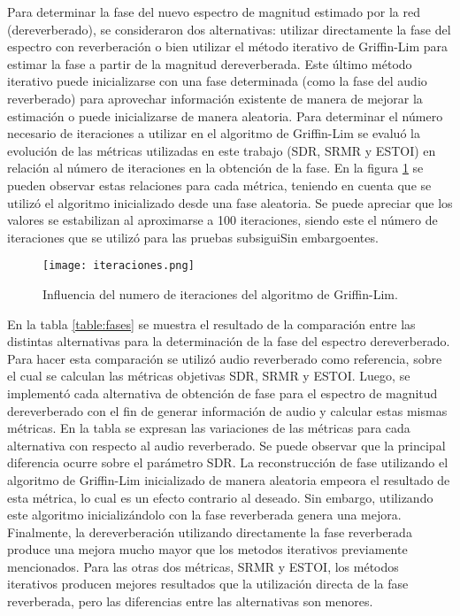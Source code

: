 Para determinar la fase del nuevo espectro de magnitud estimado por la red (dereverberado), se consideraron dos alternativas: utilizar directamente la fase del espectro con reverberación o bien utilizar el método iterativo de Griffin-Lim para estimar la fase a partir de la magnitud dereverberada. Este último método iterativo puede inicializarse con una fase determinada (como la fase del audio reverberado) para aprovechar información existente de manera de mejorar la estimación o puede inicializarse de manera aleatoria. 
Para determinar el número necesario de iteraciones a utilizar en el algoritmo de Griffin-Lim se evaluó la evolución de las métricas utilizadas en este trabajo (SDR, SRMR y ESTOI) en relación al número de iteraciones en la obtención de la fase. En la figura \ref{fig:iteraciones} se pueden observar estas relaciones para cada métrica, teniendo en cuenta que se utilizó el algoritmo inicializado desde una fase aleatoria. Se puede apreciar que los valores se estabilizan al aproximarse a 100 iteraciones, siendo este el número de iteraciones que se utilizó para las pruebas subsiguiSin embargoentes.     

\begin{figure}[H]
	\centering{}
	\texttt{[image: iteraciones.png]}
	\caption{Influencia del numero de iteraciones del algoritmo de Griffin-Lim.}
	\label{fig:iteraciones}
\end{figure}

En la tabla \ref{table:fases} se muestra el resultado de la comparación entre las distintas alternativas para la determinación de la fase del espectro dereverberado. Para hacer esta comparación se utilizó audio reverberado como referencia, sobre el cual se calculan las métricas objetivas SDR, SRMR y ESTOI. Luego, se implementó cada alternativa de obtención de fase para el espectro de magnitud dereverberado con el fin de generar información de audio y calcular estas mismas métricas. En la tabla se expresan las variaciones de las métricas para cada alternativa con respecto al audio reverberado. Se puede observar que la principal diferencia ocurre sobre el parámetro SDR. La reconstrucción de fase utilizando el algoritmo de Griffin-Lim inicializado de manera aleatoria empeora el resultado de esta métrica, lo cual es un efecto contrario al deseado. Sin embargo, utilizando este algoritmo inicializándolo con la fase reverberada genera una mejora. Finalmente, la dereverberación utilizando directamente la fase reverberada produce una mejora mucho mayor que los metodos iterativos previamente mencionados. Para las otras dos métricas, SRMR y ESTOI, los métodos iterativos producen mejores resultados que la utilización directa de la fase reverberada, pero las diferencias entre las alternativas son menores.

